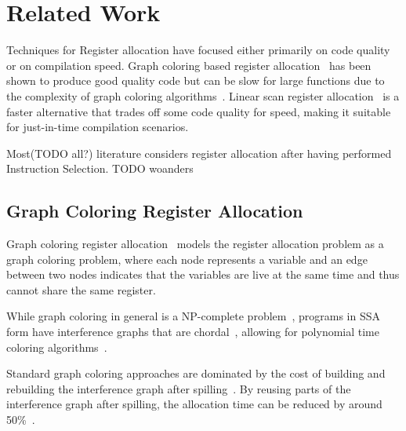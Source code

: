 
\chapter{Related Work}\label{chapter:related_work}

Techniques for Register allocation have focused either primarily on code quality or on compilation speed.
Graph coloring based register allocation~\parencite{Chaitin1981} has been shown to produce good quality code but can be slow for large functions due to the complexity of graph coloring algorithms~\parencite{Appel1998}. 
Linear scan register allocation~\parencite{Poletto1999} is a faster alternative that trades off some code quality for speed, making it suitable for just-in-time compilation scenarios.

Most(TODO all?) literature considers register allocation after having performed Instruction Selection.   TODO woanders

\section{Graph Coloring Register Allocation}
Graph coloring register allocation~\parencite{Chaitin1981} models the register allocation problem as a graph coloring problem, where each node represents a variable and an edge between two nodes indicates that the variables are live at the same time and thus cannot share the same register.

While graph coloring in general is a NP-complete problem~\parencite{Chaitin1981}, programs in SSA form have interference graphs that are chordal~\parencite{Hack06}, allowing for polynomial time coloring algorithms~\parencite{Hack06}.


Standard graph coloring approaches are dominated by the cost of building and rebuilding the interference graph after spilling~\parencite{Cooper06}.
By reusing parts of the interference graph after spilling, the allocation time can be reduced by around 50\%~\parencite{Cooper06}.

